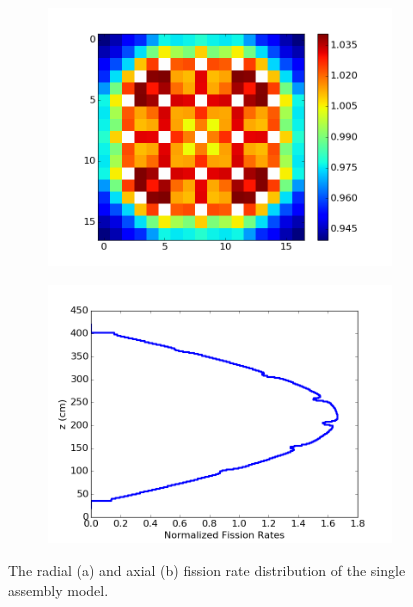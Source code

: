 \documentclass[12pt,twoside]{mitthesis-exec}
\begin{document}
\begin{figure}[h!]
	\centering
	\begin{subfigure}[b]{0.45\textwidth}
		\centering
		\includegraphics[width=\linewidth]{figures/results/rr-plots/single-assembly-radial.png}
		\caption{}
		\label{fig:single-assembly-radial}
	\end{subfigure}
	\begin{subfigure}[b]{0.45\textwidth}
		\centering
		\includegraphics[width=\linewidth]{figures/results/rr-plots/single-assembly-axial.png}
		\caption{}
		\label{fig:single-assembly-axial}
	\end{subfigure}
	\caption[]{The radial (a) and axial (b) fission rate distribution of the single assembly model.}
	\label{fig:single-assembly-dist}
\end{figure}
\end{document}
